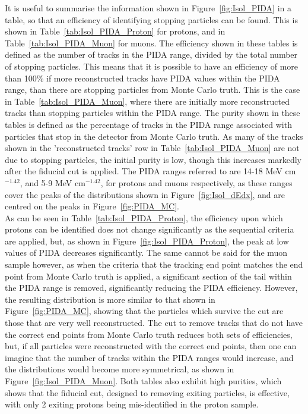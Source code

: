 
It is useful to summarise the information shown in Figure~\ref{fig:Isol_PIDA} in a table, so that an efficiency of identifying stopping particles can be found. This is shown in Table~\ref{tab:Isol_PIDA_Proton} for protons, and in Table~\ref{tab:Isol_PIDA_Muon} for muons. The efficiency shown in these tables is defined as the number of tracks in the PIDA range, divided by the total number of stopping particles. This means that it is possible to have an efficiency of more than 100\% if more reconstructed tracks have PIDA values within the PIDA range, than there are stopping particles from Monte Carlo truth. This is the case in Table~\ref{tab:Isol_PIDA_Muon}, where there are initially more reconstructed tracks than stopping particles within the PIDA range. The purity shown in these tables is defined as the percentage of tracks in the PIDA range associated with particles that stop in the detector from Monte Carlo truth. As many of the tracks shown in the 'reconstructed tracks' row in Table~\ref{tab:Isol_PIDA_Muon} are not due to stopping particles, the initial purity is low, though this increases markedly after the fiducial cut is applied. The PIDA ranges referred to are 14-18 MeV cm$^{-1.42}$, and 5-9 MeV cm$^{-1.42}$, for protons and muons respectively, as these ranges cover the peaks of the distributions shown in Figure~\ref{fig:Isol_dEdx}, and are centred on the peaks in Figure~\ref{fig:PIDA_MC}. \\

As can be seen in Table~\ref{tab:Isol_PIDA_Proton}, the efficiency upon which protons can be identified does not change significantly as the sequential criteria are applied, but, as shown in Figure~\ref{fig:Isol_PIDA_Proton}, the peak at low values of PIDA decreases significantly. The same cannot be said for the muon sample however, as when the criteria that the tracking end point matches the end point from Monte Carlo truth is applied, a significant section of the tail within the PIDA range is removed, significantly reducing the PIDA efficiency. However, the resulting distribution is more similar to that shown in Figure~\ref{fig:PIDA_MC}, showing that the particles which survive the cut are those that are very well reconstructed. The cut to remove tracks that do not have the correct end points from Monte Carlo truth reduces both sets of efficiencies, but, if all particles were reconstructed with the correct end points, then one can imagine that the number of tracks within the PIDA ranges would increase, and the distributions would become more symmetrical, as shown in Figure~\ref{fig:Isol_PIDA_Muon}. Both tables also exhibit high purities, which shows that the fiducial cut, designed to removing exiting particles, is effective, with only 2 exiting protons being mis-identified in the proton sample. \\


